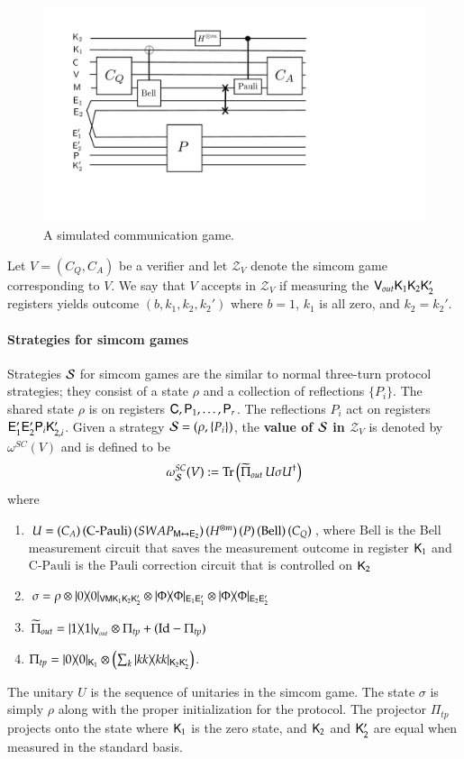 \begin{figure}[H]
\begin{center}
\includegraphics[width=4.5in]{graphics/simcom.pdf}
\end{center}
\caption{A simulated communication game.}
\label{fig:simcom}
\end{figure}

Let $V = (C_Q,C_A)$ be a verifier and let $\mathscr{Z}_V$ denote the simcom game corresponding to $V$. We say that $V$ accepts in $\mathscr{Z}_V$ if measuring the ${\mathsf{V}}_{out} {\mathsf{K}}_1 {\mathsf{K}}_2 {\mathsf{K}}_2'$ registers yields outcome $(b,k_1,k_2,k_2')$ where $b = 1$, $k_1$ is all zero, and $k_2 = k_2'$. 

\paragraph{Strategies for simcom games} Strategies $\mathcal{S}$ for simcom games are the similar to normal three-turn protocol strategies; they consist of a state $\rho$ and a collection of reflections $\{ P_i \}$. The shared state $\rho$ is on registers ${\mathsf{C}}, {\mathsf{P}}_1,\ldots,{\mathsf{P}}_r$. The reflections $P_i$ act on registers ${\mathsf{E}}_1' {\mathsf{E}}_2' {\mathsf{P}}_i {\mathsf{K}}_{2,i}'$. Given a strategy $\mathcal{S} = (\rho,\{P_i\})$, the \textbf{value of $\mathcal{S}$ in $\mathscr{Z}_V$} is denoted by $\omega^{SC}(V)$ and is defined to be
\[
	\omega^{SC}_{\mathcal{S}}(V) := \operatorname{Tr} \left( \widetilde{\Pi}_{out} \, U \sigma U^\dagger\right)
\]
where
\begin{enumerate}
	\item $U =  (C_A) \,  (\text{C-Pauli}) \, (SWAP_{{\mathsf{M}} \leftrightarrow {\mathsf{E}}_2}) \, (H^{\otimes m}) \, (P)\, (\mathrm{Bell})\, (C_Q)$, where $\mathrm{Bell}$ is the Bell measurement circuit that saves the measurement outcome in register ${\mathsf{K}}_1$ and $\text{C-Pauli}$ is the Pauli correction circuit that is controlled on ${\mathsf{K}}_2$
	\item $\sigma = \rho \otimes |0\rangle\! \langle 0|_{{\mathsf{V}} {\mathsf{M}} {\mathsf{K}}_1 {\mathsf{K}}_2 {\mathsf{K}}_2'} \otimes |\Phi\rangle\! \langle \Phi|_{{\mathsf{E}}_1 {\mathsf{E}}_1'} \otimes |\Phi\rangle\! \langle \Phi|_{{\mathsf{E}}_2 {\mathsf{E}}_2'}$
	\item  $\widetilde{\Pi}_{out} = |1\rangle\! \langle 1|_{{\mathsf{V}}_{out}} \otimes \Pi_{tp} + (\mathop{\mathrm{Id}}\!\mathinner{} - \Pi_{tp})$
	\item $\Pi_{tp} = |0\rangle\! \langle 0|_{{\mathsf{K}}_1} \otimes \left( \sum_{k} |kk\rangle\! \langle kk|_{{\mathsf{K}}_2 {\mathsf{K}}_2'}\right)$.
\end{enumerate}
The unitary $U$ is the sequence of unitaries in the simcom game. The state $\sigma$ is simply $\rho$ along with the proper initialization for the protocol. The projector $\Pi_{tp}$ projects onto the state where ${\mathsf{K}}_1$ is the zero state, and ${\mathsf{K}}_2$ and ${\mathsf{K}}_2'$ are equal when measured in the standard basis.

